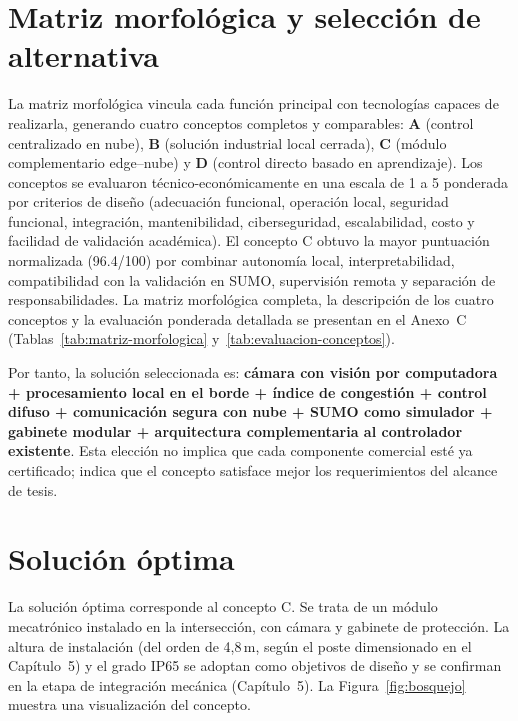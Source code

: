 \section{Matriz morfológica y selección de alternativa}\label{sec:matriz-morfologica}

La matriz morfológica vincula cada función principal con tecnologías capaces de realizarla, generando cuatro
conceptos completos y comparables: \textbf{A} (control centralizado en nube), \textbf{B} (solución industrial
local cerrada), \textbf{C} (módulo complementario edge--nube) y \textbf{D} (control directo basado en
aprendizaje). Los conceptos se evaluaron técnico-económicamente en una escala de 1 a 5 ponderada por criterios
de diseño (adecuación funcional, operación local, seguridad funcional, integración, mantenibilidad,
ciberseguridad, escalabilidad, costo y facilidad de validación académica). El concepto C obtuvo la mayor
puntuación normalizada (96.4/100) por combinar autonomía local, interpretabilidad, compatibilidad con la
validación en SUMO, supervisión remota y separación de responsabilidades. La matriz morfológica completa, la
descripción de los cuatro conceptos y la evaluación ponderada detallada se presentan en el Anexo~C
(Tablas~\ref{tab:matriz-morfologica} y~\ref{tab:evaluacion-conceptos}).

Por tanto, la solución seleccionada es: \textbf{cámara con visión por computadora + procesamiento local en el
borde + índice de congestión + control difuso + comunicación segura con nube + SUMO como simulador + gabinete
modular + arquitectura complementaria al controlador existente}. Esta elección no implica que cada componente
comercial esté ya certificado; indica que el concepto satisface mejor los requerimientos del alcance de tesis.

\section{Solución óptima}\label{sec:solucion-optima}

La solución óptima corresponde al concepto C. Se trata de un módulo mecatrónico instalado en la intersección,
con cámara y gabinete de protección. La altura de instalación (del orden de 4,8\,m, según el poste dimensionado
en el Capítulo~5) y el grado IP65 se adoptan como objetivos de diseño y se confirman en la etapa de integración
mecánica (Capítulo~5). La Figura~\ref{fig:bosquejo} muestra una
visualización del concepto.

